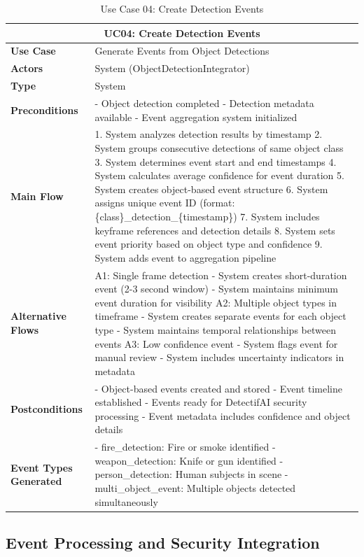 \documentclass{article}
\begin{document}
\begin{table}[H]
\centering
\begin{tabularx}{\textwidth}{|l|X|}
\hline
\multicolumn{2}{|c|}{\textbf{UC04: Create Detection Events}} \\ \hline
\textbf{Use Case} & Generate Events from Object Detections \\ \hline
\textbf{Actors} & System (ObjectDetectionIntegrator) \\ \hline
\textbf{Type} & System \\ \hline
\textbf{Preconditions} & 
- Object detection completed
- Detection metadata available
- Event aggregation system initialized \\ \hline
\textbf{Main Flow} & 
1. System analyzes detection results by timestamp
2. System groups consecutive detections of same object class
3. System determines event start and end timestamps
4. System calculates average confidence for event duration
5. System creates object-based event structure
6. System assigns unique event ID (format: \{class\}\_detection\_\{timestamp\})
7. System includes keyframe references and detection details
8. System sets event priority based on object type and confidence
9. System adds event to aggregation pipeline \\ \hline
\textbf{Alternative Flows} & 
A1: Single frame detection
- System creates short-duration event (2-3 second window)
- System maintains minimum event duration for visibility
A2: Multiple object types in timeframe
- System creates separate events for each object type
- System maintains temporal relationships between events
A3: Low confidence event
- System flags event for manual review
- System includes uncertainty indicators in metadata \\ \hline
\textbf{Postconditions} & 
- Object-based events created and stored
- Event timeline established
- Events ready for DetectifAI security processing
- Event metadata includes confidence and object details \\ \hline
\textbf{Event Types Generated} & 
- fire\_detection: Fire or smoke identified
- weapon\_detection: Knife or gun identified  
- person\_detection: Human subjects in scene
- multi\_object\_event: Multiple objects detected simultaneously \\ \hline
\end{tabularx}
\caption{Use Case 04: Create Detection Events}
\end{table}

\subsection{Event Processing and Security Integration}
\end{document}
